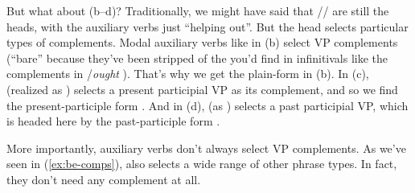But what about (b--d)? Traditionally, we might have said that // are still the heads, with the auxiliary verbs just ``helping out''. But the head selects particular types of complements. Modal auxiliary verbs like  in (b) select  VP complements (``bare'' because they've been stripped of the  you'd find in infinitivals like the complements in /\textit{ought }). That's why we get the plain-form  in (b). In (c),  (realized as ) selects a present participial VP as its complement, and so we find the present-participle form . And in (d),  (as ) selects a past participial VP, which is headed here by the past-participle form .

More importantly, auxiliary verbs don't always select VP complements. As we've seen in (\ref{ex:be-comps}),  also selects a wide range of other phrase types. In fact, they don't need any complement at all. 

